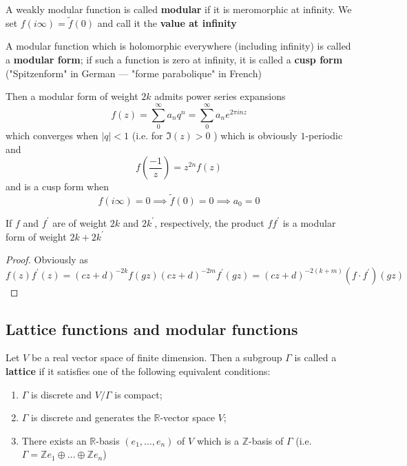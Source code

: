 \documentclass[12pt]{article}
\theoremstyle{definition}
\begin{document}
\begin{dfn}
A weakly modular function is called \textbf{modular} if it is meromorphic at infinity. We set \(f(i\infty )= \widetilde{f}(0) \) and call it the \textbf{value at infinity}  
\end{dfn}
\begin{dfn}
A modular function which is holomorphic everywhere (including infinity) is called a \textbf{modular form}; if such a function is zero at infinity, it is called a \textbf{cusp form} ("Spitzenform" in German --- "forme parabolique" in French)  
\end{dfn}
Then a modular form of weight \(2k\) admits power series expansions
\[
    f(z) = \sum_{0}^{\infty} a_n q^n = \sum_{0}^{\infty} a_n e^{2\pi i n z}
\]
which converges when \(\vert q \vert <1\) (i.e. for \(\Im (z)>0\) ) which is obviously \(1\)-periodic and 
\[
    f\left(\frac{-1}{z}\right) = z^{2n}f(z)
\]
and is a cusp form when \[f(i \infty ) = 0 \implies \widetilde{f}(0) = 0 \implies a_{0}=0 \]

\begin{claim}
    If \(f\) and \(f^{\prime} \) are of weight \(2k\) and \(2k^{\prime} \), respectively, the product \(f f^{\prime} \) is a modular form of weight \(2k+2k^{\prime} \)     
\end{claim}
\begin{proof}
    Obviously as
    \[
        f(z)f^{\prime}(z) = (cz+d)^{-2k} f(gz) (cz+d)^{-2m} f^{\prime} (gz) = (cz+d)^{-2(k+m)} (f\cdot f^{\prime} )(gz)
    \]
\end{proof}

\subsection{Lattice functions and modular functions}

\begin{dfn}
Let \(V\) be a real vector space of finite dimension. Then a subgroup \(\Gamma \) is called a \textbf{lattice} if it satisfies one of the following equivalent conditions:
\begin{enumerate}[label=(\alph*)]
    \item \(\Gamma \) is discrete and \(V/\Gamma \) is compact;
    \item \(\Gamma \) is discrete and generates the \(\mathbb{R} \)-vector space \(V\);
    \item There exists an \(\mathbb{R} \)-basis \((e_1,\dots,e_n)\) of \(V\) which is a \(\mathbb{Z} \)-basis of \(\Gamma \) (i.e. \(\Gamma = \mathbb{Z} e_1 \oplus  \dots \oplus \mathbb{Z} e_n\))        
\end{enumerate}   
\end{dfn}
\end{document}
